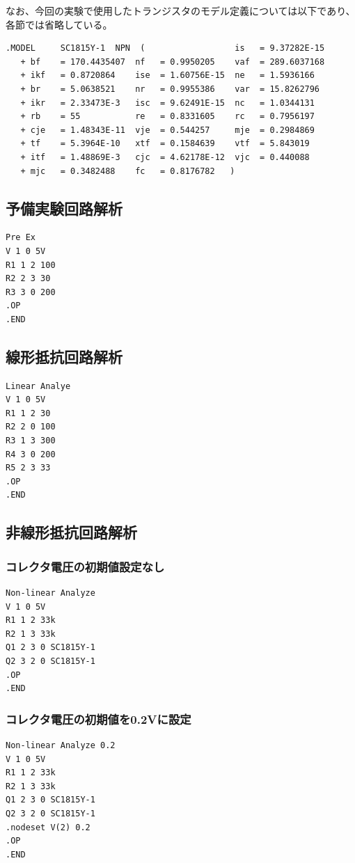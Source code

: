 \documentclass{jlreq}
\numberwithin{equation}{section}
\begin{document}
なお、今回の実験で使用したトランジスタのモデル定義については以下であり、各節では省略している。
\begin{verbatim}
.MODEL     SC1815Y-1  NPN  (                  is   = 9.37282E-15  
   + bf    = 170.4435407  nf   = 0.9950205    vaf  = 289.6037168  
   + ikf   = 0.8720864    ise  = 1.60756E-15  ne   = 1.5936166 
   + br    = 5.0638521    nr   = 0.9955386    var  = 15.8262796  
   + ikr   = 2.33473E-3   isc  = 9.62491E-15  nc   = 1.0344131  
   + rb    = 55           re   = 0.8331605    rc   = 0.7956197  
   + cje   = 1.48343E-11  vje  = 0.544257     mje  = 0.2984869  
   + tf    = 5.3964E-10   xtf  = 0.1584639    vtf  = 5.843019  
   + itf   = 1.48869E-3   cjc  = 4.62178E-12  vjc  = 0.440088  
   + mjc   = 0.3482488    fc   = 0.8176782	 )
\end{verbatim}

\subsection{予備実験回路解析}
\begin{verbatim}
Pre Ex
V 1 0 5V
R1 1 2 100
R2 2 3 30
R3 3 0 200
.OP
.END
\end{verbatim}

\subsection{線形抵抗回路解析}
\begin{verbatim}
Linear Analye
V 1 0 5V
R1 1 2 30
R2 2 0 100
R3 1 3 300
R4 3 0 200
R5 2 3 33
.OP
.END
\end{verbatim}

\subsection{非線形抵抗回路解析}
\subsubsection{コレクタ電圧の初期値設定なし}
\begin{verbatim}
Non-linear Analyze
V 1 0 5V
R1 1 2 33k
R2 1 3 33k
Q1 2 3 0 SC1815Y-1
Q2 3 2 0 SC1815Y-1
.OP
.END
\end{verbatim}

\subsubsection{コレクタ電圧の初期値を0.2Vに設定}
\begin{verbatim}
Non-linear Analyze 0.2
V 1 0 5V
R1 1 2 33k
R2 1 3 33k
Q1 2 3 0 SC1815Y-1
Q2 3 2 0 SC1815Y-1
.nodeset V(2) 0.2
.OP
.END
\end{verbatim}
\end{document}
